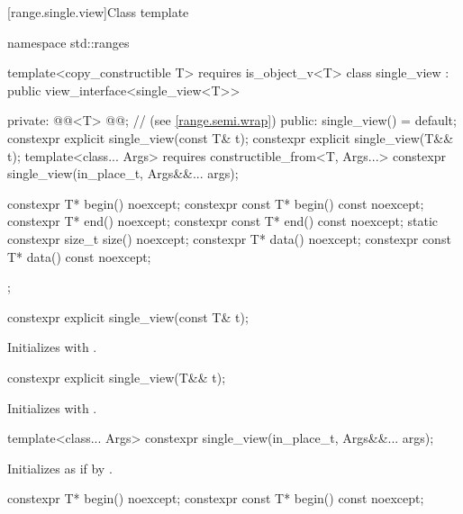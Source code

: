 [range.single.view]{Class template }

%
\begin{codeblock}
namespace std::ranges {
  template<copy_constructible T>
    requires is_object_v<T>
  class single_view : public view_interface<single_view<T>> {
  private:
    @@<T> @@;      // \expos{} (see \ref{range.semi.wrap})
  public:
    single_view() = default;
    constexpr explicit single_view(const T& t);
    constexpr explicit single_view(T&& t);
    template<class... Args>
      requires constructible_from<T, Args...>
    constexpr single_view(in_place_t, Args&&... args);

    constexpr T* begin() noexcept;
    constexpr const T* begin() const noexcept;
    constexpr T* end() noexcept;
    constexpr const T* end() const noexcept;
    static constexpr size_t size() noexcept;
    constexpr T* data() noexcept;
    constexpr const T* data() const noexcept;
  };
}
\end{codeblock}

%
\begin{itemdecl}
constexpr explicit single_view(const T& t);
\end{itemdecl}

\begin{itemdescr}
\pnum
\effects
Initializes  with .
\end{itemdescr}

%
\begin{itemdecl}
constexpr explicit single_view(T&& t);
\end{itemdecl}

\begin{itemdescr}
\pnum
\effects
Initializes  with .
\end{itemdescr}

%
\begin{itemdecl}
template<class... Args>
constexpr single_view(in_place_t, Args&&... args);
\end{itemdecl}

\begin{itemdescr}
\pnum
\effects
Initializes  as if by
.
\end{itemdescr}

%
\begin{itemdecl}
constexpr T* begin() noexcept;
constexpr const T* begin() const noexcept;
\end{itemdecl}

